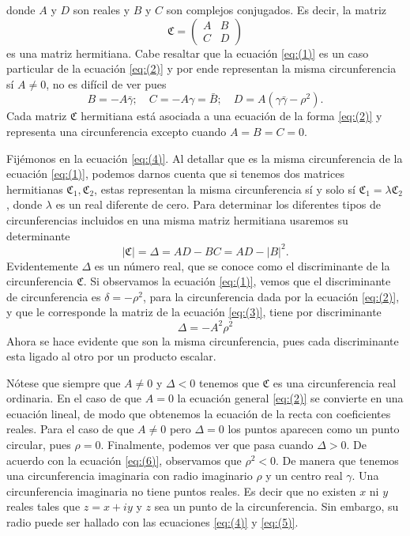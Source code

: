 \documentclass{matematicasud}
\begin{document}
donde $A$ y $D$ son reales y $B$ y $C$ son complejos conjugados. Es decir, la matriz
\begin{equation}
    \mathfrak{C}=
    \begin{pmatrix}
        A & B \\
        C & D 
    \end{pmatrix}
    \label{eq:(3)}
\end{equation}
es una matriz hermitiana.
Cabe resaltar que la ecuación \eqref{eq:(1)} es un caso particular de la ecuación \eqref{eq:(2)} y por ende representan la misma circunferencia sí $A\neq 0$, no es difícil de ver pues
\begin{equation}
    B=-A\bar{\gamma};\quad C=-A\gamma = \bar{B}; \quad D = A(\gamma\bar{\gamma}-\rho^2). 
    \label{eq:(4)}
\end{equation}
Cada matriz $\mathfrak{C}$ hermitiana está asociada a una ecuación de la forma \eqref{eq:(2)} y representa una circunferencia excepto cuando $A=B=C=0$.

Fijémonos en la ecuación \eqref{eq:(4)}. Al detallar que es la misma circunferencia de la ecuación \eqref{eq:(1)}, podemos darnos cuenta que si tenemos dos matrices hermitianas $\mathfrak{C}_1,\mathfrak{C}_2$, estas representan la misma circunferencia sí y solo sí $\mathfrak{C}_1=\lambda\mathfrak{C}_2$, donde $\lambda$ es un real diferente de cero. Para determinar los diferentes tipos de circunferencias incluidos en una misma matriz hermitiana usaremos su determinante
\begin{equation}
    |\mathfrak{C}|=\Delta = AD-BC=AD-|B|^2.
    \label{eq:(5)}
\end{equation}
Evidentemente $\Delta$ es un número real, que se conoce como el discriminante de la circunferencia $\mathfrak{C}$. Si observamos la ecuación \eqref{eq:(1)}, vemos que el discriminante de circunferencia es $\delta = -\rho^2$, para la circunferencia dada por la ecuación \eqref{eq:(2)}, y que le corresponde la matriz de la ecuación \eqref{eq:(3)}, tiene por discriminante 
\begin{equation}
    \Delta = -A^2\rho^2
    \label{eq:(6)}
\end{equation}
Ahora se hace evidente que son la misma circunferencia, pues cada discriminante esta ligado al otro por un producto escalar.

Nótese que siempre que $A \neq 0$ y $\Delta < 0$ tenemos que $\mathfrak{C}$ es una circunferencia real ordinaria. En el caso de que $A=0$ la ecuación general \eqref{eq:(2)} se convierte en una ecuación lineal, de modo que obtenemos la ecuación de la recta con coeficientes reales. Para el caso de que $A \neq 0$ pero $\Delta = 0$ los puntos aparecen como un punto circular, pues $\rho = 0$. Finalmente, podemos ver que pasa cuando $\Delta > 0$. De acuerdo con la ecuación \eqref{eq:(6)}, observamos que $\rho^2 < 0$. De manera que tenemos una circunferencia imaginaria con radio imaginario $\rho$ y un centro real $\gamma$. Una circunferencia imaginaria no tiene puntos reales. Es decir que no existen $x$ ni $y$ reales tales que $z=x+iy$ y $z$ sea un punto de la circunferencia. Sin embargo, su radio puede ser hallado con las ecuaciones \eqref{eq:(4)} y \eqref{eq:(5)}.
\end{document}
